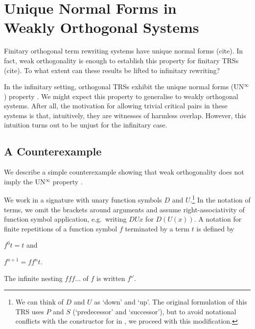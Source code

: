 \chapter[\texorpdfstring{UN$^\infty$ in Weakly Orthogonal Systems}{UN
  in Weakly Orthogonal Systems}]{\texorpdfstring{Unique Normal Forms
    in\\Weakly Orthogonal Systems}{Unique Normal Forms in Weakly
    Orthogonal Systems}}\label{chap:unwo}

Finitary orthogonal term rewriting systems have unique normal forms
(cite). In fact, weak orthogonality is enough to establish this
property for finitary TRSs (cite). To what extent can these results be
lifted to infinitary rewriting?

In the infinitary setting, orthogonal TRSs exhibit the unique
normal forms (UN$^\infty$) property
\citep{kennaway-95,klop-de-vrijer-05}. We might expect this property
to generalise to weakly orthogonal systems. After all, the motivation
for allowing trivial critical pairs in these systems is that,
intuitively, they are witnesses of harmless overlap. However, this
intuition turns out to be unjust for the infinitary case.


\section{A Counterexample}\label{sec:counterexample}

We describe a simple counterexample showing that weak orthogonality
does not imply the UN$^\infty$ property \citep{endrullis-10}.

We work in a signature with unary function symbols $D$ and
$U$.\footnote{We can think of $D$ and $U$ as `down' and `up'. The
  original formulation of this TRS uses $P$ and $S$ (`predecessor' and
  `successor'), but to avoid notational conflicts with the
  constructor for
  in \Coq, we proceed with this modification.}
In the notation of terms, we omit the brackets around arguments and
assume right-associativity of function symbol application,
e.g.\ writing $DUx$ for $D(U(x))$. A notation for finite repetitions
of a function symbol $f$ terminated by a term $t$ is defined by
\begin{inparaenum}[(i)]
\item $f^0 t = t$ and
\item $f^{n+1} = ff^nt$.
\end{inparaenum}
The infinite nesting $fff \ldots$ of $f$ is written $f^\omega$.

